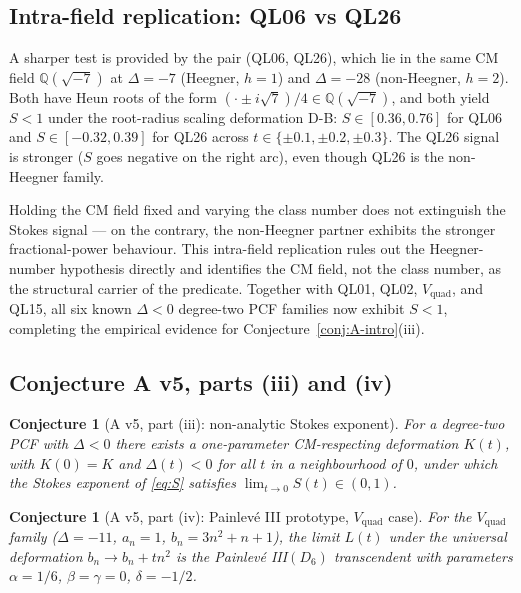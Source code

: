 \documentclass[11pt,reqno]{amsart}
\newtheorem{conjecture}[theorem]{Conjecture}
\theoremstyle{definition}
\begin{document}
\subsection{Intra-field replication: QL06 vs QL26}
\label{ssec:intrafield}

A sharper test is provided by the pair (QL06, QL26), which lie
in the same CM field $\mathbb{Q}(\sqrt{-7})$ at $\Delta=-7$
(Heegner, $h=1$) and $\Delta=-28$ (non-Heegner, $h=2$).
Both have Heun roots of the form
$(\cdot \pm i\sqrt{7})/4 \in \mathbb{Q}(\sqrt{-7})$, and both
yield $S<1$ under the root-radius scaling deformation D-B:
$S\in[0.36,0.76]$ for QL06 and $S\in[-0.32,0.39]$ for QL26
across $t\in\{\pm 0.1,\pm 0.2,\pm 0.3\}$. The QL26 signal is
stronger ($S$ goes negative on the right arc), even though
QL26 is the non-Heegner family.

Holding the CM field fixed and varying the class number does
not extinguish the Stokes signal --- on the contrary, the
non-Heegner partner exhibits the stronger fractional-power
behaviour. This intra-field replication rules out the
Heegner-number hypothesis directly and identifies the CM
field, not the class number, as the structural carrier of
the predicate. Together with QL01, QL02,
$V_{\mathrm{quad}}$, and QL15, all six known $\Delta<0$
degree-two PCF families now exhibit $S<1$, completing the
empirical evidence for Conjecture~\ref{conj:A-intro}(iii).

\subsection{Conjecture A v5, parts (iii) and (iv)}

\begin{conjecture}[A v5, part (iii):
non-analytic Stokes exponent]\label{conj:A3}
For a degree-two PCF with $\Delta<0$ there exists a
one-parameter CM-respecting deformation $K(t)$, with
$K(0)=K$ and $\Delta(t)<0$ for all $t$ in a neighbourhood
of $0$, under which the Stokes exponent of \eqref{eq:S}
satisfies $\lim_{t\to 0}S(t) \in (0,1)$.
\end{conjecture}

\begin{conjecture}[A v5, part (iv):
Painlev\'e III prototype, $V_{\mathrm{quad}}$ case]
\label{conj:A4}
For the $V_{\mathrm{quad}}$ family ($\Delta=-11$, $a_{n}=1$,
$b_{n}=3n^{2}+n+1$), the limit $L(t)$ under the universal
deformation $b_{n}\to b_{n}+tn^{2}$ is the Painlev\'e
III$(D_{6})$ transcendent with parameters
$\alpha=1/6$, $\beta=\gamma=0$, $\delta=-1/2$.
\end{conjecture}
\end{document}
